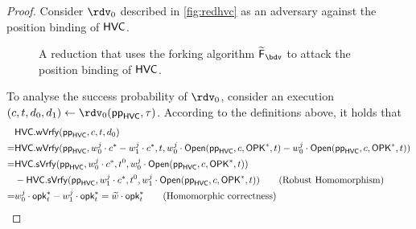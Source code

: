 \begin{proof}
  Consider $\rdv_0$ described in \autoref{fig:redhvc} as an adversary against the position binding of $\mathsf{HVC}$.
  \begin{figure}\centering{}
  \caption{A reduction that uses the forking algorithm $\widetilde\fork_\bdv$ to attack the position binding of $\mathsf{HVC}$.}\label{fig:redhvc}
  \end{figure}
  To analyse the success probability of $\rdv_0$, consider an execution $(c,t,d_0,d_1)\gets\rdv_0(\hvcparams,\tau)$.
  According to the definitions above, it holds that
  \begin{align*}
    & \hvc.\wverify(\hvcparams,c,t,d_0)\\
    =& \hvc.\wverify(\hvcparams,w^j_0\cdot c^* - w^j_1\cdot c^*,t,w^j_0\cdot\open(\hvcparams,c,\opks^*,t) - w^j_0\cdot\open(\hvcparams,c,\opks^*,t))\\
    =& \hvc.\sverify(\hvcparams,w^j_0\cdot c^*,t^0,w^j_0\cdot\open(\hvcparams,c,\opks^*,t))\\ &- \hvc.\sverify(\hvcparams,w^j_1\cdot c^*,t^0,w^j_1\cdot\open(\hvcparams,c,\opks^*,t))
    \tag{Robust Homomorphism}\\
    =& w^j_0\cdot \opk^*_t - w^j_1\cdot \opk^*_t = \widetilde w\cdot \opk^*_t \tag{Homomorphic correctness}

\end{align*}
\end{proof}
